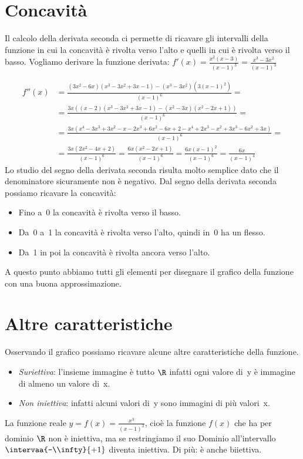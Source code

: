 \section{Concavità}
\label{sec:04_concavita}
Il calcolo della derivata seconda ci permette di ricavare gli intervalli 
della funzione in cui la concavità è rivolta verso l'alto e quelli in cui è 
rivolta verso il basso. Vogliamo derivare la funzione derivata:
\(f'(x)=\frac{x^2(x-3)}{(x-1)^3}=\frac{x^3-3x^2}{(x-1)^3}\)

\begin{align*}
f''(x) &= \frac{(3x^2 -6x)(x^3-3x^2+3x-1)-(x^3-3x^2)(3(x-1)^2)}{(x-1)^6} =\\
       &= \frac{3x((x -2)(x^3-3x^2+3x-1)-(x^2-3x)(x^2-2x+1))}{(x-1)^6} =\\
       &= \frac{3x(x^4-3x^3+3x^2-x-2x^3+6x^2-6x+2-x^4+2x^3-x^2+3x^3-6x^2+3x)}
               {(x-1)^6} =\\
       &= \frac{3x(2x^2-4x+2)}{(x-1)^6} = \frac{6x(x^2-2x+1)}{(x-1)^6} =
          \frac{6x(x-1)^2}{(x-1)^6} = \frac{6x}{(x-1)^4}
\end{align*}
Lo studio del segno della derivata seconda risulta molto semplice dato che il 
denominatore sicuramente non è negativo. 
Dal segno della derivata seconda possiamo ricavare la concavità:
\begin{center}
 \segnoderivatasecondaa
\end{center}

\begin{itemize} [nosep]
 \item Fino a~0 la concavità è rivolta verso il basso.
 \item Da~0 a~1 la concavità è rivolta verso l'alto, quindi in~0 ha un flesso.
 \item Da~1 in poi la concavità è rivolta ancora verso l'alto.
\end{itemize}

A questo punto abbiamo tutti gli elementi per disegnare il grafico della 
funzione con una buona approssimazione.
\begin{center} \tuttoassiemea \end{center}

\section{Altre caratteristiche}
\label{sec:altre_caratteristche}

% 
Osservando il grafico possiamo ricavare alcune altre caratteristiche della 
funzione.
\begin{itemize} [nosep]
 \item \emph{Suriettiva}: l'insieme immagine è tutto \(\R\) infatti ogni 
valore di~y è immagine di almeno un valore di~x.
 \item \emph{Non iniettiva}: infatti alcuni valori di~y sono immagini di più 
valori~x.
\end{itemize}

\begin{newoss}
La funzione reale \(y = f(x) = \frac{x^3}{(x-1)^2}\), cioè la funzione 
\(f(x)\) che ha per dominio \(\R\) non è iniettiva, ma se restringiamo 
il suo Dominio all'intervallo \(\intervaa{-\\infty}{+1}\) diventa iniettiva. 
Di più: è anche biiettiva.
\end{newoss}


